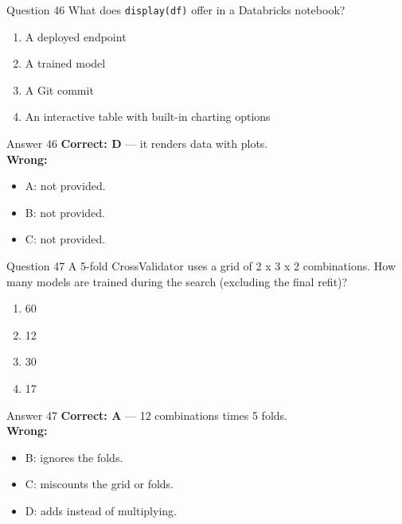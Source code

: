 \documentclass[aspectratio=169,11pt]{beamer}
\begin{document}
\begin{frame}{Question 46}
What does \texttt{display(df)} offer in a Databricks notebook?
\begin{enumerate}[label=\Alph*.]
\item A deployed endpoint
\item A trained model
\item A Git commit
\item An interactive table with built-in charting options
\end{enumerate}
\end{frame}
\begin{frame}{Answer 46}
\textbf{Correct: D} --- it renders data with plots.\\
\vspace{0.5em}
\textbf{Wrong:}
\begin{itemize}
\item A: not provided.
\item B: not provided.
\item C: not provided.
\end{itemize}
\end{frame}

\begin{frame}{Question 47}
A 5-fold CrossValidator uses a grid of 2 x 3 x 2 combinations. How many models are trained during the search (excluding the final refit)?
\begin{enumerate}[label=\Alph*.]
\item 60
\item 12
\item 30
\item 17
\end{enumerate}
\end{frame}
\begin{frame}{Answer 47}
\textbf{Correct: A} --- 12 combinations times 5 folds.\\
\vspace{0.5em}
\textbf{Wrong:}
\begin{itemize}
\item B: ignores the folds.
\item C: miscounts the grid or folds.
\item D: adds instead of multiplying.
\end{itemize}
\end{frame}
\end{document}

